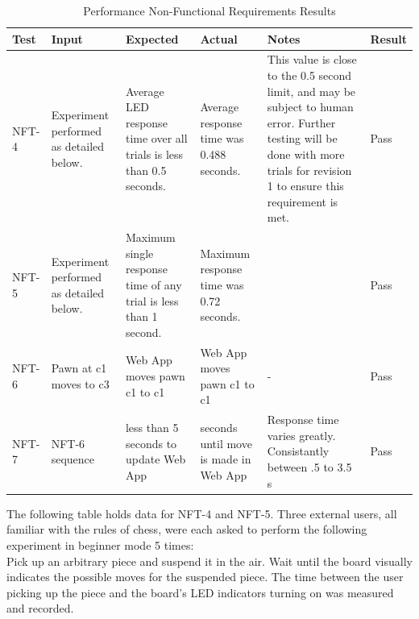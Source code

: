 \documentclass[12pt, titlepage]{article}
\begin{document}
\begin{table}[H]
    \centering
        \setlength{\leftmargini}{0cm}
        \begin{tabular}{| >{\centering\arraybackslash}m{2cm} | 
            >{\centering\arraybackslash}m{2.5cm} | 
            >{\centering\arraybackslash}m{3cm} | 
            >{\centering\arraybackslash}m{2cm} |
            >{\centering\arraybackslash}m{4cm} |
            >{\centering\arraybackslash}m{1.5cm} |}
        \hline
        \rowcolor[gray]{0.9}
        Test & Input & Expected & Actual & Notes & Result\\
        \hline
        NFT-4 & Experiment performed as detailed below. & Average LED response time over all trials is less than 0.5 seconds. & Average response time was 0.488 seconds. & This value is close to the 0.5 second limit, and may be subject to human error. Further testing will be done with more trials for revision 1 to ensure this requirement is met. & Pass \\
        \hline
        NFT-5 & Experiment performed as detailed below. & Maximum single response time of any trial is less than 1 second. & Maximum response time was 0.72 seconds. &  & Pass \\
        \hline
        NFT-6 & Pawn at c1 moves to c3 & Web App moves pawn c1 to c1 & Web App moves pawn c1 to c1 & - & Pass \\
        \hline
        NFT-7 & NFT-6 sequence & less than 5 seconds to update Web App & 2.3 seconds until move is made in Web App & Response time varies greatly. Consistantly between .5 to 3.5 s & Pass \\
        \hline
        \end{tabular}
    \caption{Performance Non-Functional Requirements Results}
\end{table}

\newpage
The following table holds data for NFT-4 and NFT-5. Three external users, all familiar with the rules of chess, were each asked to perform the following experiment in beginner mode 5 times:
\medskip
\\
Pick up an arbitrary piece and suspend it in the air. Wait until the board visually indicates the possible moves for the suspended piece. The time between the user picking up 
the piece and the board's LED indicators turning on was measured and recorded.
\end{document}
